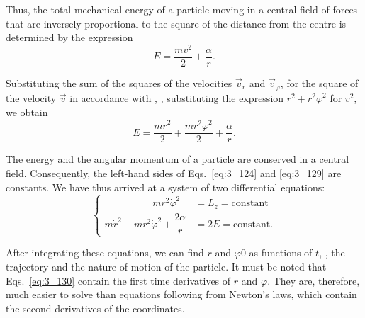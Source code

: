 \noindent
Thus, the total mechanical energy of a particle moving in a central field of forces that are inversely proportional to the square of the distance from the centre is determined by the expression
\begin{equation}\label{eq:3_128}
E = \frac{mv^2}{2} + \frac{\alpha}{r}.
\end{equation}

\noindent
Substituting the sum of the squares of the velocities $\vec{v}_r$ and $\vec{v}_{\varphi}$, for the square of the velocity $\vec{v}$ in accordance with , \ie, substituting the expression $r^2+r^2\dot{\varphi}^2$ for $v^2$, we obtain
\begin{equation}\label{eq:3_129}
E = \frac{m\dot{r}^2}{2} + \frac{mr^2\dot{\varphi}^2}{2} + \frac{\alpha}{r}.
\end{equation}

The energy and the angular momentum of a particle are conserved in a central field. Consequently, the left-hand sides of Eqs.~\eqref{eq:3_124} and \eqref{eq:3_129} are constants. We have thus arrived at a system of two differential equations:
\begin{equation}\label{eq:3_130}
\begin{cases}
\quad\quad\quad\quad\,\,\,\,\, mr^2\dot{\varphi}^2 \!\!\!\!&= L_z = \text{constant}\\
m\dot{r}^2 + mr^2\dot{\varphi}^2 + \dfrac{2\alpha}{r} \!\!\!\!&= 2E = \text{constant}.
\end{cases}
\end{equation}

\noindent
After integrating these equations, we can find $r$ and $\varphi0$ as functions of $t$, \ie, the trajectory and the nature of motion of the particle. It must be noted that Eqs.~\eqref{eq:3_130} contain the first time derivatives of $r$ and $\varphi$. They are, therefore, much easier to solve than equations following from Newton's laws, which contain the second derivatives of the coordinates.

